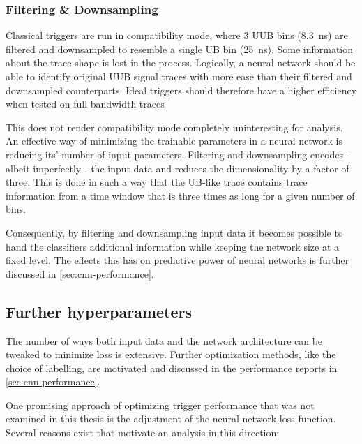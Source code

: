 \subsubsection{Filtering \& Downsampling}
\label{sssec:filtering-and-downsampling}

Classical triggers are run in compatibility mode, where 3 UUB bins (\SI{8.3}{\nano\second}) are filtered and downsampled to resemble a single UB bin 
(\SI{25}{\nano\second}). Some information about the trace shape is lost in the process. Logically, a neural network should be able to identify original UUB signal 
traces with more ease than their filtered and downsampled counterparts. Ideal triggers should therefore have a higher efficiency when tested on full bandwidth 
traces

This does not render compatibility mode completely uninteresting for analysis. An effective way of minimizing the trainable parameters in a neural network is 
reducing its' number of input parameters. Filtering and downsampling encodes - albeit imperfectly - the input data and reduces the dimensionality by a factor of 
three. This is done in such a way that the UB-like trace contains trace information from a time window that is three times as long for a given number of bins.

Consequently, by filtering and downsampling input data it becomes possible to hand the classifiers additional information while keeping the network size at a fixed
level. The effects this has on predictive power of neural networks is further discussed in \autoref{sec:cnn-performance}. 

\subsection{Further hyperparameters}
\label{ssec:further-hyperparameters}

The number of ways both input data and the network architecture can be tweaked to minimize loss is extensive. Further optimization methods, like the choice of 
labelling, are motivated and discussed in the performance reports in \autoref{sec:cnn-performance}.

One promising approach of optimizing trigger performance that was not examined in this thesis is the adjustment of the neural network loss function. Several reasons
exist that motivate an analysis in this direction:

